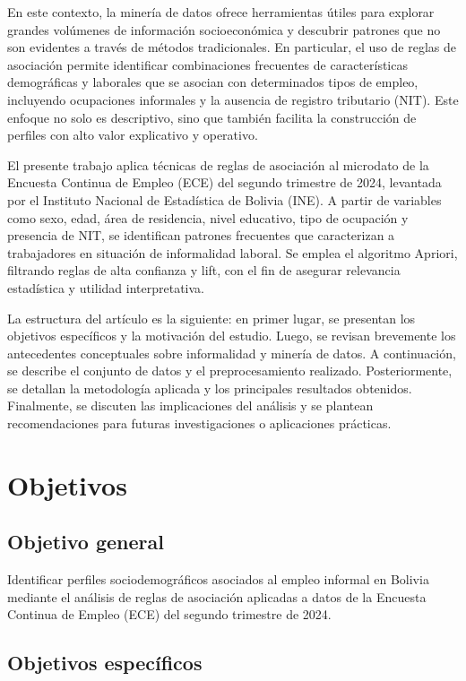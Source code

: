 \documentclass[Royal,times,sageh]{sagej}
\begin{document}
En este contexto, la minería de datos ofrece herramientas útiles para
explorar grandes volúmenes de información socioeconómica y descubrir
patrones que no son evidentes a través de métodos tradicionales. En
particular, el uso de reglas de asociación permite identificar
combinaciones frecuentes de características demográficas y laborales que
se asocian con determinados tipos de empleo, incluyendo ocupaciones
informales y la ausencia de registro tributario (NIT). Este enfoque no
solo es descriptivo, sino que también facilita la construcción de
perfiles con alto valor explicativo y operativo.

El presente trabajo aplica técnicas de reglas de asociación al microdato
de la Encuesta Continua de Empleo (ECE) del segundo trimestre de 2024,
levantada por el Instituto Nacional de Estadística de Bolivia (INE). A
partir de variables como sexo, edad, área de residencia, nivel
educativo, tipo de ocupación y presencia de NIT, se identifican patrones
frecuentes que caracterizan a trabajadores en situación de informalidad
laboral. Se emplea el algoritmo Apriori, filtrando reglas de alta
confianza y lift, con el fin de asegurar relevancia estadística y
utilidad interpretativa.

La estructura del artículo es la siguiente: en primer lugar, se
presentan los objetivos específicos y la motivación del estudio. Luego,
se revisan brevemente los antecedentes conceptuales sobre informalidad y
minería de datos. A continuación, se describe el conjunto de datos y el
preprocesamiento realizado. Posteriormente, se detallan la metodología
aplicada y los principales resultados obtenidos. Finalmente, se discuten
las implicaciones del análisis y se plantean recomendaciones para
futuras investigaciones o aplicaciones prácticas.

\section{Objetivos}\label{objetivos}

\subsection{Objetivo general}\label{objetivo-general}

Identificar perfiles sociodemográficos asociados al empleo informal en
Bolivia mediante el análisis de reglas de asociación aplicadas a datos
de la Encuesta Continua de Empleo (ECE) del segundo trimestre de 2024.

\subsection{Objetivos específicos}\label{objetivos-especuxedficos}
\end{document}
